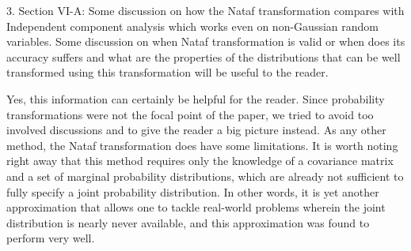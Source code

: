 \begin{reviewer}
3. Section VI-A:  Some discussion on how the Nataf transformation compares with Independent component analysis which works even on non-Gaussian random variables. Some discussion on when Nataf transformation is valid or when does its accuracy suffers and what are the properties of the distributions that can be well transformed using this transformation will be useful to the reader.
\end{reviewer}
\begin{authors}
Yes, this information can certainly be helpful for the reader.
Since probability transformations were not the focal point of the paper, we tried to avoid too involved discussions and to give the reader a big picture instead.
As any other method, the Nataf transformation does have some limitations.
It is worth noting right away that this method requires only the knowledge of a covariance matrix and a set of marginal probability distributions, which are already not sufficient to fully specify a joint probability distribution.
In other words, it is yet another approximation that allows one to tackle real-world problems wherein the joint distribution is nearly never available, and this approximation was found to perform very well.
\end{authors}

